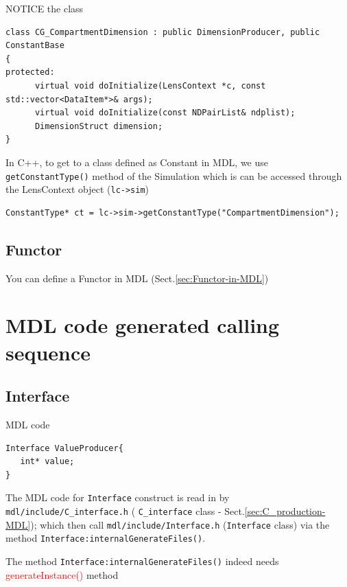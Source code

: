 NOTICE the class
\begin{lstlisting}
class CG_CompartmentDimension : public DimensionProducer, public ConstantBase
{
protected:
      virtual void doInitialize(LensContext *c, const std::vector<DataItem*>& args);
      virtual void doInitialize(const NDPairList& ndplist);
      DimensionStruct dimension;
}
\end{lstlisting}


In C++, to get to a class defined as Constant in MDL, we use
\verb!getConstantType()! method of the Simulation which is can be accessed
through the LensContext object (\verb!lc->sim!)
\begin{lstlisting}
ConstantType* ct = lc->sim->getConstantType("CompartmentDimension");
\end{lstlisting}

\subsection{Functor}
\label{sec:Functor-MDL}


You can define a Functor in MDL (Sect.\ref{sec:Functor-in-MDL})





\section{MDL code generated calling sequence}
\label{sec:MDL-C++-generated-code}

\subsection{Interface}
\label{sec:Interface-MDL}
\label{sec:generateInstance-Interface-MDL}

MDL code
\begin{verbatim}
Interface ValueProducer{
   int* value;
}
\end{verbatim}

The MDL code for \verb!Interface! construct is read in by
\verb!mdl/include/C_interface.h! ( \verb!C_interface! class -
Sect.\ref{sec:C_production-MDL}); which then call \verb!mdl/include/Interface.h!
(\verb!Interface! class) via the method \verb!Interface:internalGenerateFiles()!.

The method \verb!Interface:internalGenerateFiles()! indeed needs
\textcolor{red}{generateInstance()} method

